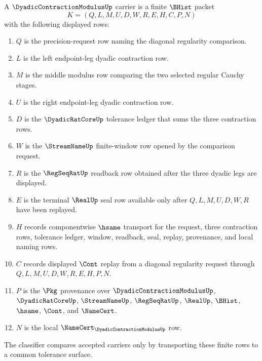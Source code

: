 \begin{definition}
\label{def:dyadic-contraction-modulus-carrier}
A $\DyadicContractionModulusUp$ carrier is a finite $\BHist$ packet
$$
K=(Q,L,M,U,D,W,R,E,H,C,P,N)
$$
with the following displayed rows:
\begin{enumerate}
\item $Q$ is the precision-request row naming the diagonal regularity comparison.
\item $L$ is the left endpoint-leg dyadic contraction row.
\item $M$ is the middle modulus row comparing the two selected regular Cauchy stages.
\item $U$ is the right endpoint-leg dyadic contraction row.
\item $D$ is the $\DyadicRatCoreUp$ tolerance ledger that sums the three contraction rows.
\item $W$ is the $\StreamNameUp$ finite-window row opened by the comparison request.
\item $R$ is the $\RegSeqRatUp$ readback row obtained after the three dyadic legs are displayed.
\item $E$ is the terminal $\RealUp$ seal row available only after $Q,L,M,U,D,W,R$ have been replayed.
\item $H$ records componentwise $\hsame$ transport for the request, three contraction rows, tolerance ledger, window, readback, seal, replay, provenance, and local naming rows.
\item $C$ records displayed $\Cont$ replay from a diagonal regularity request through $Q,L,M,U,D,W,R,E,H,P,N$.
\item $P$ is the $\Pkg$ provenance over $\DyadicContractionModulusUp$, $\DyadicRatCoreUp$, $\StreamNameUp$, $\RegSeqRatUp$, $\RealUp$, $\BHist$, $\hsame$, $\Cont$, and $\NameCert$.
\item $N$ is the local $\NameCert_{\DyadicContractionModulusUp}$ row.
\end{enumerate}
The classifier compares accepted carriers only by transporting these finite rows to a common tolerance surface.
\end{definition}

